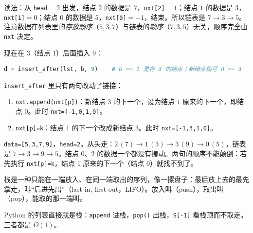 读法：从 \texttt{head}$=2$ 出发，结点 $2$ 的数据是 $7$，\texttt{nxt[2]}$=1$；结点 $1$ 的数据是 $3$，\texttt{nxt[1]}$=0$；结点 $0$ 的数据是 $5$，\texttt{nxt[0]}$=-1$，结束。所以链表是 $7\to3\to5$。注意数据在列表里的\emph{存放顺序}（$5,3,7$）与链表的\emph{顺序}（$7,3,5$）无关，顺序完全由 \texttt{nxt} 决定。

\begin{center}
\end{center}

现在在 $3$（结点 $1$）后面插入 $9$：

\begin{lstlisting}[language=Python,style=frag]
d = insert_after(lst, b, 9)    # b == 1 是存 3 的结点；新结点编号 d == 3
\end{lstlisting}

\texttt{insert\_after} 里只有两句改动了链接：
\begin{enumerate}
\item \texttt{nxt.append(nxt[p])}：新结点 $3$ 的下一个，设为结点 $1$ 原来的下一个，即结点 $0$。此时 \texttt{nxt=[-1,0,1,0]}。
\item \texttt{nxt[p]=k}：结点 $1$ 的下一个改成新结点 $3$。此时 \texttt{nxt=[-1,3,1,0]}。
\end{enumerate}
\texttt{data=[5,3,7,9]}，\texttt{head=2}。从头走：$2\,(7)\to1\,(3)\to3\,(9)\to0\,(5)$，链表是 $7\to3\to9\to5$。结点 $0$、$2$ 的数据一个都没有挪动。两句的顺序不能颠倒：若先执行 \texttt{nxt[p]=k}，结点 $1$ 原来的下一个（结点 $0$）就找不到了。


栈是一种只能在一端放入、在同一端取出的序列，像一摞盘子：最后放上去的最先拿走，叫“后进先出”（last in, first out，LIFO）。放入叫（push），取出叫（pop），能取的那一端叫。

Python 的列表直接就是栈：\texttt{append} 进栈，\texttt{pop()} 出栈，\texttt{S[-1]} 看栈顶而不取走。三者都是 $O(1)$。

